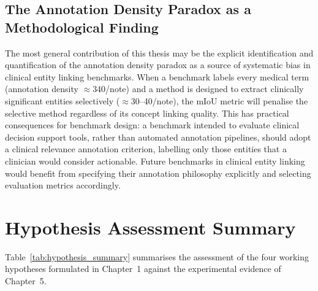 \subsection{The Annotation Density Paradox as a Methodological Finding}

The most general contribution of this thesis may be the explicit identification and quantification of the annotation density paradox as a source of systematic bias in clinical entity linking benchmarks. When a benchmark labels every medical term (annotation density $\approx$340/note) and a method is designed to extract clinically significant entities selectively ($\approx$30--40/note), the mIoU metric will penalise the selective method regardless of its concept linking quality. This has practical consequences for benchmark design: a benchmark intended to evaluate clinical decision support tools, rather than automated annotation pipelines, should adopt a clinical relevance annotation criterion, labelling only those entities that a clinician would consider actionable. Future benchmarks in clinical entity linking would benefit from specifying their annotation philosophy explicitly and selecting evaluation metrics accordingly.

\section{Hypothesis Assessment Summary}

Table~\ref{tab:hypothesis_summary} summarises the assessment of the four working hypotheses formulated in Chapter~1 against the experimental evidence of Chapter~5.

